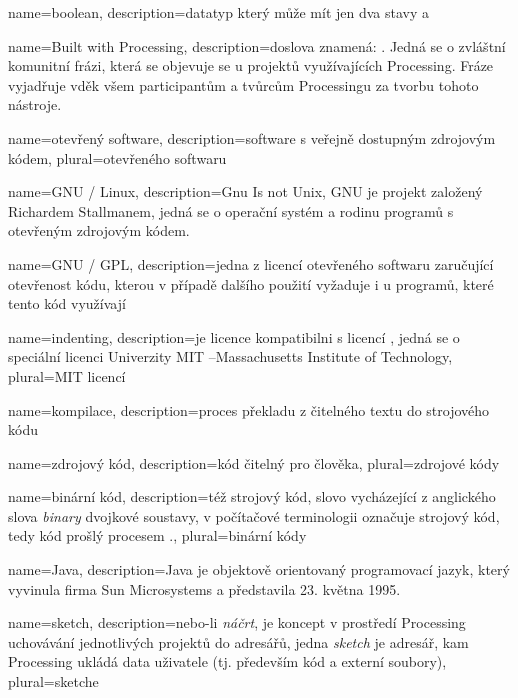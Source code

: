 {
  name={boolean},
  description={datatyp který může mít jen dva stavy  a }
}

{
	name={Built with Processing},
	description={doslova znamená: . Jedná se o zvláštní komunitní frázi, která se objevuje se u projektů využívajících Processing. Fráze vyjadřuje vděk všem participantům a tvůrcům Processingu za tvorbu tohoto nástroje.}
}

{
  name={otevřený software},
  description={software s veřejně dostupným zdrojovým kódem},
  plural={otevřeného softwaru}
}

{
  name={GNU / Linux},
  description={Gnu Is not Unix, GNU je projekt založený Richardem Stallmanem, jedná se o operační systém a rodinu programů s otevřeným zdrojovým kódem.}
}

{
  name={GNU / GPL},
  description={jedna z licencí otevřeného softwaru zaručující otevřenost kódu, kterou v případě dalšího použití vyžaduje i u programů, které tento kód využívají}
}

{
  name={indenting},
  description={je licence kompatibilni s licencí , jedná se o speciální licenci Univerzity MIT --Massachusetts Institute of Technology},
  plural={MIT licencí}
}


{
	name={kompilace},
	description={proces překladu z čitelného textu do strojového kódu}
}

{
	name={zdrojový kód},
	description={kód čitelný pro člověka},
	plural={zdrojové kódy}
}

{
	name={binární kód},
	description={též strojový kód, slovo vycházející z anglického slova {\em binary} dvojkové soustavy, v počítačové terminologii označuje strojový kód, tedy kód prošlý procesem .},
	plural={binární kódy}
}

{
	name={Java},
	description={Java je objektově orientovaný programovací jazyk, který vyvinula firma Sun Microsystems a představila 23. května 1995.}
}

{
	name={sketch},
	description={nebo-li {\em náčrt}, je koncept v prostředí Processing uchovávání jednotlivých projektů do adresářů, jedna {\em sketch} je adresář, kam Processing ukládá data uživatele (tj. především kód a externí soubory)},
	plural={sketche}
}


